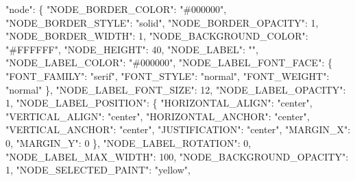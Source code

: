 \documentclass[
]{book}
\newenvironment{Shaded}{\begin{snugshade}}{\end{snugshade}}
\newcommand{\DecValTok}[1]{\textcolor[rgb]{0.00,0.00,0.81}{#1}}
\newcommand{\NormalTok}[1]{#1}
\newcommand{\StringTok}[1]{\textcolor[rgb]{0.31,0.60,0.02}{#1}}
\begin{document}
\begin{Shaded}
\begin{Highlighting}[numbers=left,,]
                    \StringTok{"node"}\NormalTok{: \{}
                        \StringTok{"NODE\_BORDER\_COLOR"}\NormalTok{: }\StringTok{"\#000000"}\NormalTok{,}
                        \StringTok{"NODE\_BORDER\_STYLE"}\NormalTok{: }\StringTok{"solid"}\NormalTok{,}
                        \StringTok{"NODE\_BORDER\_OPACITY"}\NormalTok{: }\DecValTok{1}\NormalTok{,}
                        \StringTok{"NODE\_BORDER\_WIDTH"}\NormalTok{: }\DecValTok{1}\NormalTok{,}
                        \StringTok{"NODE\_BACKGROUND\_COLOR"}\NormalTok{: }\StringTok{"\#FFFFFF"}\NormalTok{,}
                        \StringTok{"NODE\_HEIGHT"}\NormalTok{: }\DecValTok{40}\NormalTok{,}
                        \StringTok{"NODE\_LABEL"}\NormalTok{: }\StringTok{""}\NormalTok{,}
                        \StringTok{"NODE\_LABEL\_COLOR"}\NormalTok{: }\StringTok{"\#000000"}\NormalTok{,}
                        \StringTok{"NODE\_LABEL\_FONT\_FACE"}\NormalTok{: \{}
                            \StringTok{"FONT\_FAMILY"}\NormalTok{: }\StringTok{"serif"}\NormalTok{,}
                            \StringTok{"FONT\_STYLE"}\NormalTok{: }\StringTok{"normal"}\NormalTok{,}
                            \StringTok{"FONT\_WEIGHT"}\NormalTok{: }\StringTok{"normal"}
\NormalTok{                        \},}
                        \StringTok{"NODE\_LABEL\_FONT\_SIZE"}\NormalTok{: }\DecValTok{12}\NormalTok{,}
                        \StringTok{"NODE\_LABEL\_OPACITY"}\NormalTok{: }\DecValTok{1}\NormalTok{,}
                        \StringTok{"NODE\_LABEL\_POSITION"}\NormalTok{: \{}
                            \StringTok{"HORIZONTAL\_ALIGN"}\NormalTok{: }\StringTok{"center"}\NormalTok{,}
                            \StringTok{"VERTICAL\_ALIGN"}\NormalTok{: }\StringTok{"center"}\NormalTok{,}
                            \StringTok{"HORIZONTAL\_ANCHOR"}\NormalTok{: }\StringTok{"center"}\NormalTok{,}
                            \StringTok{"VERTICAL\_ANCHOR"}\NormalTok{: }\StringTok{"center"}\NormalTok{,}
                            \StringTok{"JUSTIFICATION"}\NormalTok{: }\StringTok{"center"}\NormalTok{,}
                            \StringTok{"MARGIN\_X"}\NormalTok{: }\DecValTok{0}\NormalTok{,}
                            \StringTok{"MARGIN\_Y"}\NormalTok{: }\DecValTok{0}
\NormalTok{                        \},}
                        \StringTok{"NODE\_LABEL\_ROTATION"}\NormalTok{: }\DecValTok{0}\NormalTok{,}
                        \StringTok{"NODE\_LABEL\_MAX\_WIDTH"}\NormalTok{: }\DecValTok{100}\NormalTok{,}
                        \StringTok{"NODE\_BACKGROUND\_OPACITY"}\NormalTok{: }\DecValTok{1}\NormalTok{,}
                        \StringTok{"NODE\_SELECTED\_PAINT"}\NormalTok{: }\StringTok{"yellow"}\NormalTok{,}

\end{Highlighting}
\end{Shaded}
\end{document}
